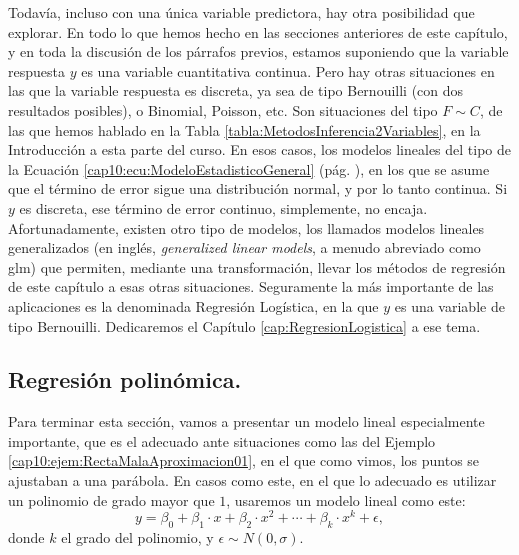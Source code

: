 Todavía, incluso con una única variable predictora, hay otra posibilidad que explorar. En todo lo que hemos hecho en las secciones anteriores de este capítulo, y en toda la discusión de los párrafos previos, estamos suponiendo que la variable respuesta $y$ es una variable cuantitativa continua. Pero hay otras situaciones en las que la variable respuesta es discreta, ya sea de tipo Bernouilli (con dos resultados posibles), o Binomial, Poisson, etc. Son situaciones del tipo $F\sim C$, de las que hemos hablado en la Tabla \ref{tabla:MetodosInferencia2Variables}, en la Introducción a esta parte del curso. En esos casos, los modelos lineales del tipo de la Ecuación \ref{cap10:ecu:ModeloEstadisticoGeneral} (pág. \pageref{cap10:ecu:ModeloEstadisticoGeneral}), en los que se asume que el término de error sigue una distribución normal, y por lo tanto continua. Si $y$ es discreta, ese término de error continuo, simplemente, no encaja. Afortunadamente, existen otro tipo de modelos, los llamados {\sf modelos lineales generalizados} (en inglés, {\em generalized linear models}, a menudo abreviado como {\sf glm}) que permiten, mediante una transformación, llevar los métodos de regresión de este capítulo a esas otras situaciones. Seguramente la más importante de las aplicaciones es la denominada Regresión Logística, en la que $y$ es una variable de tipo Bernouilli. Dedicaremos el Capítulo \ref{cap:RegresionLogistica} a ese tema.


\subsection{Regresión polinómica.}
\label{cap10:subsec:RegresionPolinomica}

Para terminar esta sección, vamos a presentar un modelo lineal especialmente importante, que es el adecuado ante situaciones como las del Ejemplo \ref{cap10:ejem:RectaMalaAproximacion01}, en el que como vimos, los puntos se ajustaban a una parábola. En casos como este, en el que lo adecuado es utilizar un polinomio de grado mayor que $1$, usaremos un modelo lineal como este:
\begin{equation}\label{cap10:ecu:ModeloRegresionPolinomica}
y=\beta_0 +\beta_1\cdot x+\beta_2\cdot x^2+\cdots+\beta_k\cdot x^k+\epsilon,
\end{equation}
donde $k$ el {\sf grado del polinomio}, y $\epsilon\sim N(0,\sigma)$.

